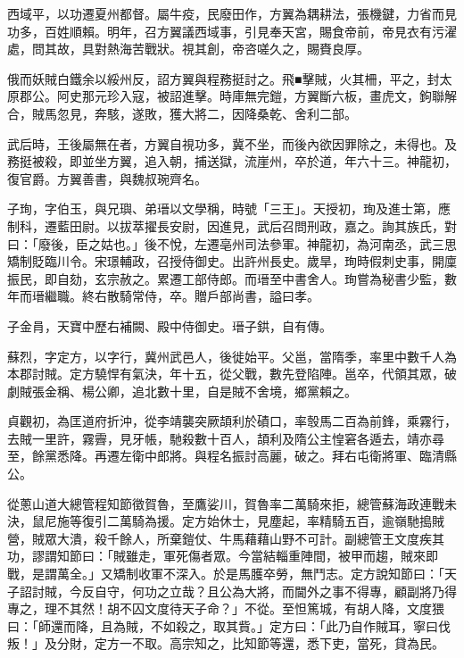 \begin{pinyinscope}
 西域平，以功遷夏州都督。屬牛疫，民廢田作，方翼為耦耕法，張機鍵，力省而見功多，百姓順賴。明年，召方翼議西域事，引見奉天宮，賜食帝前，帝見衣有污濯處，問其故，具對熱海苦戰狀。視其創，帝咨嗟久之，賜賚良厚。



 俄而妖賊白鐵余以綏州反，詔方翼與程務挺討之。飛■擊賊，火其柵，平之，封太原郡公。阿史那元珍入寇，被詔進擊。時庫無完鎧，方翼斷六板，畫虎文，鉤聯解合，賊馬忽見，奔駭，遂敗，獲大將二，因降桑乾、舍利二部。



 武后時，王後屬無在者，方翼自視功多，冀不坐，而後內欲因罪除之，未得也。及務挺被殺，即並坐方翼，追入朝，捕送獄，流崖州，卒於道，年六十三。神龍初，復官爵。方翼善書，與魏叔琬齊名。



 子珣，字伯玉，與兄璵、弟瑨以文學稱，時號「三王」。天授初，珣及進士第，應制科，遷藍田尉。以拔萃擢長安尉，因進見，武后召問刑政，嘉之。詢其族氏，對曰：「廢後，臣之姑也。」後不悅，左遷亳州司法參軍。神龍初，為河南丞，武三思矯制貶臨川令。宋璟輔政，召授侍御史。出許州長史。歲旱，珣時假刺史事，開廩振民，即自劾，玄宗赦之。累遷工部侍郎。而瑨至中書舍人。珣嘗為秘書少監，數年而瑨繼職。終右散騎常侍，卒。贈戶部尚書，謚曰孝。



 子金肙，天寶中歷右補闕、殿中侍御史。瑨子鉷，自有傳。



 蘇烈，字定方，以字行，冀州武邑人，後徙始平。父邕，當隋季，率里中數千人為本郡討賊。定方驍悍有氣決，年十五，從父戰，數先登陷陣。邕卒，代領其眾，破劇賊張金稱、楊公卿，追北數十里，自是賊不舍境，鄉黨賴之。



 貞觀初，為匡道府折沖，從李靖襲突厥頡利於磧口，率彀馬二百為前鋒，乘霧行，去賊一里許，霧霽，見牙帳，馳殺數十百人，頡利及隋公主惶窘各遁去，靖亦尋至，餘黨悉降。再遷左衛中郎將。與程名振討高麗，破之。拜右屯衛將軍、臨清縣公。



 從蔥山道大總管程知節徵賀魯，至鷹娑川，賀魯率二萬騎來拒，總管蘇海政連戰未決，鼠尼施等復引二萬騎為援。定方始休士，見塵起，率精騎五百，逾嶺馳搗賊營，賊眾大潰，殺千餘人，所棄鎧仗、牛馬藉藉山野不可計。副總管王文度疾其功，謬謂知節曰：「賊雖走，軍死傷者眾。今當結輜重陣間，被甲而趨，賊來即戰，是謂萬全。」又矯制收軍不深入。於是馬臒卒勞，無鬥志。定方說知節曰：「天子詔討賊，今反自守，何功之立哉？且公為大將，而閫外之事不得專，顧副將乃得專之，理不其然！胡不囚文度待天子命？」不從。至怛篤城，有胡人降，文度猥曰：「師還而降，且為賊，不如殺之，取其貲。」定方曰：「此乃自作賊耳，寧曰伐叛！」及分財，定方一不取。高宗知之，比知節等還，悉下吏，當死，貸為民。




\end{pinyinscope}
